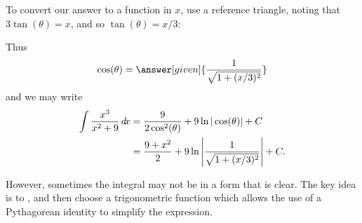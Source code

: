 \documentclass{ximera}
\begin{document}
\begin{example}
\begin{explanation}
\[    \]
    To convert our answer to a function in $x$, use a reference
    triangle, noting that $3\tan(\theta) = x$, and so $\tan(\theta) =
    x/3$:
    \begin{image}
    \end{image}
    Thus
    \[
    \cos(\theta) =  \answer[given]{\frac{1}{\sqrt{1+(x/3)^2}}}
    \]
    and we may write
    \begin{align*}
      \int \frac{x^3}{x^2+9} \mathop{}\!d\! x &= \frac{9}{2\cos^2(\theta)} + 9\ln|\cos(\theta)| + C\\
      &= \frac{9+x^2}{2} + 9 \ln\left|\frac{1}{\sqrt{1+(x/3)^2}}\right| + C.
    \end{align*}
  \end{explanation}
\end{example}


However, sometimes the integral may not be in a form that is clear.
The key idea is to , and then choose a
trigonometric function which allows the use of a Pythagorean identity
to simplify the expression.
\end{document}
